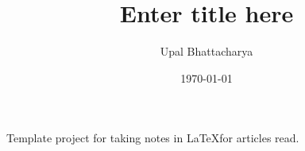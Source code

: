 \documentclass[a4paper,colorinlistoftodos]{article}
\author{Upal Bhattacharya}
\date{\today}
\title{Enter title here}
\begin{document}
\maketitle

\begingroup
    \hypersetup{linkcolor=black}
    \tableofcontents
    \pagebreak
\endgroup

\linenumbers

Template project for taking notes in \LaTeX for articles read.




\pagebreak
\nolinenumbers
\appendix

\begingroup
    \hypersetup{linkcolor=black}
    \listoftodos
    \listofchanges
    \pagebreak
\endgroup
\end{document}
